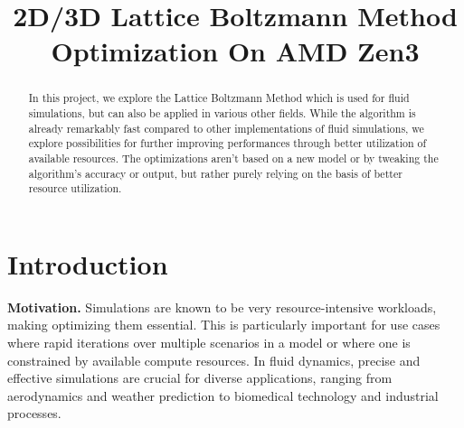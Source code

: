 \documentclass[letterpaper]{article}
\title{2D/3D Lattice Boltzmann Method Optimization On AMD Zen3}
\newcommand{\mypar}[1]{{\bf #1.}}
\begin{document}
%
\maketitle
%


\begin{abstract}

In this project, we explore the Lattice Boltzmann Method which is used for fluid simulations, but can also be applied in various other fields. While the algorithm is already remarkably fast compared to other implementations of fluid simulations, we explore possibilities for further improving performances through better utilization of available resources. The optimizations aren't based on a new model or by tweaking the algorithm's accuracy or output, but rather purely relying on the basis of better resource utilization.



\end{abstract}


\section{Introduction}\label{sec:intro}


\mypar{Motivation} 
Simulations are known to be very resource-intensive workloads, making optimizing them essential. This is particularly important for use cases where rapid iterations over multiple scenarios in a model or where one is constrained by available compute resources. In fluid dynamics, precise and effective simulations are crucial for diverse applications, ranging from aerodynamics and weather prediction to biomedical technology and industrial processes. 
\end{document}

